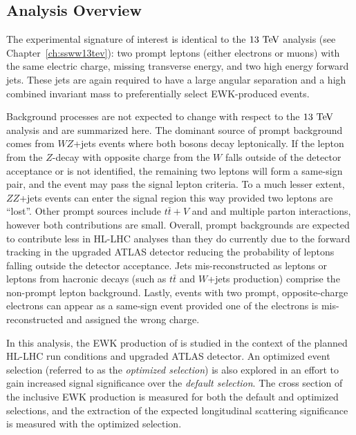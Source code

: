 \subsection{Analysis Overview}
The experimental signature of interest is identical to the $13\tev$ analysis (see Chapter~\ref{ch:ssww13tev}): two prompt leptons (either electrons or muons) with the same electric charge, missing transverse energy, and two high energy forward jets.
These jets are again required to have a large angular separation and a high combined invariant mass to preferentially select EWK-produced \ssww events.

Background processes are not expected to change with respect to the $13\tev$ analysis and are summarized here. %
The dominant source of prompt background comes from $WZ$+jets events where both bosons decay leptonically.  
If the lepton from the $Z$-decay with opposite charge from the $W$ falls outside of the detector acceptance or is not identified, the remaining two leptons will form a same-sign pair, and the event may pass the signal lepton criteria.
To a much lesser extent, $ZZ$+jets events can enter the signal region this way provided two leptons are ``lost''.
Other prompt sources include $t\bar{t}+V$ and and multiple parton interactions, however both contributions are small.
Overall, prompt backgrounds are expected to contribute less in HL-LHC analyses than they do currently due to the forward tracking in the upgraded ATLAS detector reducing the probability of leptons falling outside the detector acceptance.
Jets mis-reconstructed as leptons or leptons from hacronic decays (such as $t\bar{t}$ and $W$+jets production) comprise the non-prompt lepton background.
Lastly, events with two prompt, opposite-charge electrons can appear as a same-sign event provided one of the electrons is mis-reconstructed and assigned the wrong charge.

In this analysis, the EWK production of \ssww is studied in the context of the planned HL-LHC run conditions and upgraded ATLAS detector.
An optimized event selection (referred to as the \emph{optimized selection}) is also explored in an effort to gain increased signal significance over the \emph{default selection}. %
The cross section of the inclusive EWK production is measured for both the default and optimized selections, and the extraction of the expected longitudinal scattering significance is measured with the optimized selection.
